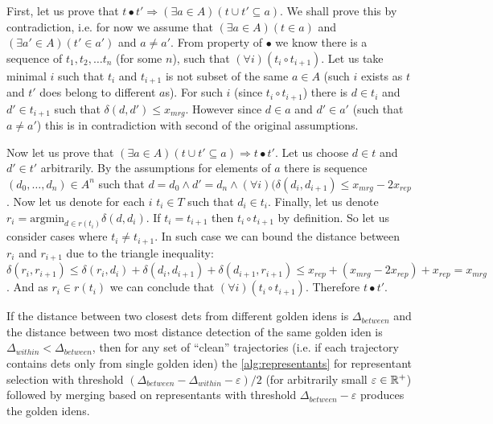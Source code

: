\begin{myproof}
First, let us prove that $t \bullet t' \Rightarrow (\exists a \in A) (t \cup t' \subseteq a)$. We shall prove this by contradiction, i.e. for now we assume
that $(\exists a \in A) (t \in a)$ and $(\exists a' \in A) (t' \in a')$ and $a \neq a'$. From property of $\bullet$ we know there is a sequence of $t_1, t_2, \ldots t_n$ (for some $n$), such that $(\forall i) (t_i \circ t_{i+1})$. Let
us take minimal $i$ such that $t_i$ and $t_{i+1}$ is not subset of the same
$a \in A$ (such $i$ exists as $t$ and $t'$ does belong to different $a$s).
For such $i$ (since $t_i \circ t_{i+1}$) there is $d \in t_i$ and
$d' \in t_{i+1}$ such that $\delta(d, d') \leq x_{mrg}$. However since $d \in a$
and $d' \in a'$ (such that $a \neq a'$) this is in contradiction with second
of the original assumptions.

Now let us prove that $(\exists a \in A) (t \cup t' \subseteq a) \Rightarrow t \bullet t'$. Let us choose $d \in t$ and $d' \in t'$ arbitrarily. By the
assumptions for elements of $a$ there is sequence $(d_0, \ldots, d_n) \in A^n$
such that $d = d_0 \land d' = d_n \land (\forall i) (\delta(d_i, d_{i+1}) \leq x_{mrg} - 2x_{rep}$. Now let us denote for each $i$ $t_i \in T$ such that
$d_i \in t_i$. Finally, let us denote $r_i = \mathrm{argmin}_{d \in r(t_i)} \delta(d, d_i)$. If $t_i = t_{i+1}$ then $t_i \circ t_{i+1}$ by definition.
So let us consider cases where $t_i \neq t_{i+1}$. In such case we can bound
the distance between $r_i$ and $r_{i+1}$ due to the triangle inequality:
$\delta(r_i, r_{i+1}) \leq \delta(r_i, d_i) + \delta(d_i, d_{i+1}) + \delta(d_{i+1}, r_{i+1}) \leq x_{rep} + (x_{mrg} - 2x_{rep}) + x_{rep} = x_{mrg}$. And as $r_i \in r(t_i)$ we can conclude that $(\forall i) (t_i \circ t_{i+1})$. Therefore $t \bullet t'$.\end{myproof}


\begin{cor}
If the distance between two closest \glspl{det} from different golden
\glspl{iden} is $\Delta_{between}$ and the distance between two most distance detection
of the same golden \gls{iden} is $\Delta_{within} < \Delta_{between}$, then for any set of ``clean''
trajectories (i.e. if each trajectory contains \glspl{det} only from single
golden \gls{iden}) the \autoref{alg:representants} for representant selection
with threshold $(\Delta_{between} - \Delta_{within} - \varepsilon) / 2$ (for arbitrarily small
$\varepsilon \in \mathbb{R}^+$) followed by merging based on representants with
threshold $\Delta_{between} - \varepsilon$ produces the golden \glspl{iden}.
\end{cor}

